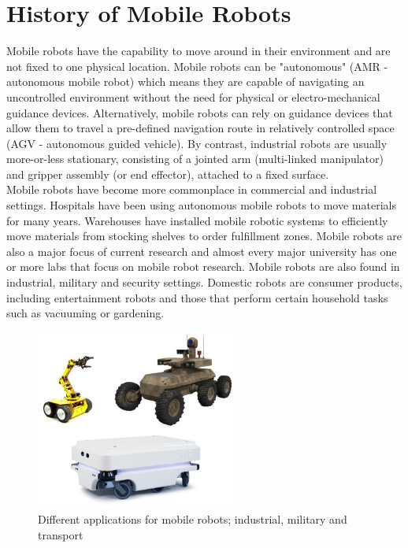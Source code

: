 \documentclass[12pt]{book}
\begin{document}
\section{History of Mobile Robots} 
Mobile robots have the capability to move around in their environment and are not fixed to one physical location. Mobile robots can be "autonomous" (AMR - autonomous mobile robot) which means they are capable of navigating an uncontrolled environment without the need for physical or electro-mechanical guidance devices. Alternatively, mobile robots can rely on guidance devices that allow them to travel a pre-defined navigation route in relatively controlled space (AGV - autonomous guided vehicle). By contrast, industrial robots are usually more-or-less stationary, consisting of a jointed arm (multi-linked manipulator) and gripper assembly (or end effector), attached to a fixed surface.\\
Mobile robots have become more commonplace in commercial and industrial settings. Hospitals have been using autonomous mobile robots to move materials for many years. Warehouses have installed mobile robotic systems to efficiently move materials from stocking shelves to order fulfillment zones. Mobile robots are also a major focus of current research and almost every major university has one or more labs that focus on mobile robot research. Mobile robots are also found in industrial, military and security settings. Domestic robots are consumer products, including entertainment robots and those that perform certain household tasks such as vacuuming or gardening. \cite{202}


\begin{figure}[H]
 \centering
\includegraphics[width =0.6\textwidth]{Fig/mobile_robots_apps.jpg}
\caption{Different applications for mobile robots; industrial, military and transport}

\end{figure}
\end{document}
